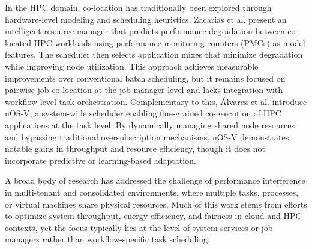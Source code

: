 In the HPC domain, co-location has traditionally been explored through hardware-level modeling and scheduling heuristics. Zacarias et al. present an intelligent resource manager that predicts performance degradation between co-located HPC workloads using performance monitoring counters (PMCs) as model features. The scheduler then selects application mixes that minimize degradation while improving node utilization. This approach achieves measurable improvements over conventional batch scheduling, but it remains focused on pairwise job co-location at the job-manager level and lacks integration with workflow-level task orchestration. Complementary to this, Álvarez et al. introduce nOS-V, a system-wide scheduler enabling fine-grained co-execution of HPC applications at the task level. By dynamically managing shared node resources and bypassing traditional oversubscription mechanisms, nOS-V demonstrates notable gains in throughput and resource efficiency, though it does not incorporate predictive or learning-based adaptation.

A broad body of research has addressed the challenge of performance interference in multi-tenant and consolidated environments, where multiple tasks, processes, or virtual machines share physical resources. Much of this work stems from efforts to optimize system throughput, energy efficiency, and fairness in cloud and HPC contexts, yet the focus typically lies at the level of system services or job managers rather than workflow-specific task scheduling.


